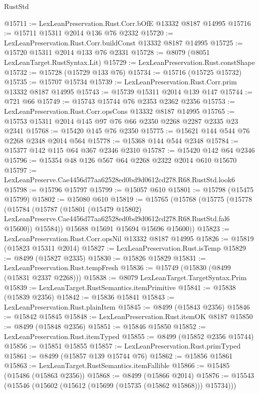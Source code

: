 \begin{lexlean}{RustStd}
\begin{coremodule}
@15711 := LexLeanPreservation.Rust.Corr.bOfE @13332 @8187 @14995
@15716 := @15711 @15311 @2014 @136 @76 @2332
@15720 := LexLeanPreservation.Rust.Corr.buildConst @13332 @8187 @14995
@15725 := @15720 @15311 @2014 @133 @76 @2331
@15728 := @8079 (@8051 LexLeanTarget.RustSyntax.Lit)
@15729 := LexLeanPreservation.Rust.constShape
@15732 := @15728 (@15729 @133 @76)
@15734 := @15716 (@15725 @15732)
@15735 := @15707 @15734
@15739 := LexLeanPreservation.Rust.Corr.prim @13332 @8187 @14995
@15743 := @15739 @15311 @2014 @139 @147
@15744 := @721 @66
@15749 := @15743 @15744 @76 @2353 @2362 @2356
@15753 := LexLeanPreservation.Rust.Corr.opsCons @13332 @8187 @14995
@15765 := @15753 @15311 @2014 @145 @97 @76 @66 @2350 @2268 @2287 @2335 @23 @2341
@15768 := @15420 @145 @76 @2350
@15775 := @15621 @144 @544 @76 @2268 @2348 @2014 @564
@15778 := @15368 @144 @544 @2348
@15784 := @15377 @142 @115 @64 @367 @2346 @2310
@15787 := @15420 @142 @64 @2346
@15796 := @15354 @48 @126 @567 @64 @2268 @2322 @2014 @610 @15670
@15797 := LexLeanPreserve.Cae4456d77aa62528ed0bd9d0612cd278.R68.RustStd.look6
@15798 := @15796 @15797
@15799 := @15057 @610
@15801 := @15798 (@15475 @15799)
@15802 := @15080 @610
@15819 := @15765
    (@15768
      (@15775
        (@15778
          (@15784
            (@15787
              (@15801
                (@15479 @15802)
                LexLeanPreserve.Cae4456d77aa62528ed0bd9d0612cd278.R68.RustStd.fal6
                @15600))
            @15584))
        @15688
        @15691
        @15694
        @15696
        @15600))
@15823 := LexLeanPreservation.Rust.Corr.opsNil @13332 @8187 @14995
@15826 := @15819 (@15823 @15311 @2014)
@15827 := LexLeanPreservation.Rust.isTemp
@15829 := @8499 (@15827 @2335)
@15830 := @15826 @15829
@15831 := LexLeanPreservation.Rust.tempFresh
@15836 := @15749 (@15830 (@8499 (@15831 @2337 @2268)))
@15838 := @8079 LexLeanTarget.TargetSyntax.Prim
@15839 := LexLeanTarget.RustSemantics.itemPrimitive
@15841 := @15838 (@15839 @2356)
@15842 := @15836 @15841
@15843 := LexLeanPreservation.Rust.plainItem
@15845 := @8499 (@15843 @2356)
@15846 := @15842 @15845
@15848 := LexLeanPreservation.Rust.itemOK @8187
@15850 := @8499 (@15848 @2356)
@15851 := @15846 @15850
@15852 := LexLeanPreservation.Rust.itemTyped
@15855 := @8499 (@15852 @2356 @15744)
@15856 := @15851 @15855
@15857 := LexLeanPreservation.Rust.primTyped
@15861 := @8499 (@15857 @139 @15744 @76)
@15862 := @15856 @15861
@15863 := LexLeanTarget.RustSemantics.itemFallible
@15866 := @15485 (@15486 (@15863 @2356))
@15868 := @8499 (@15866 @2014)
@15876 := @15543 (@15546 (@15602 (@15612 (@15699 (@15735 (@15862 @15868))) @15734)))

\end{coremodule}
\end{lexlean}
